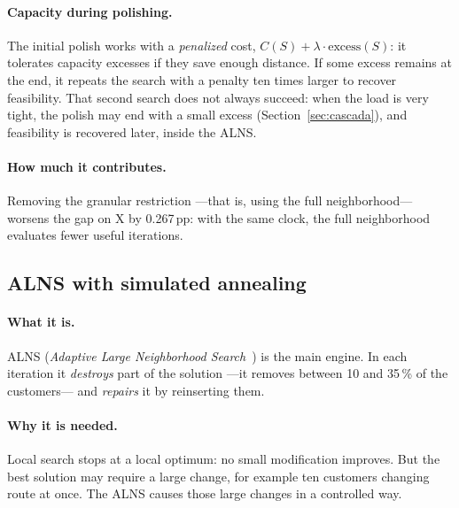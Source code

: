 \documentclass[11pt,a4paper]{article}
\newcommand{\pp}{\,pp}
\begin{document}
\paragraph{Capacity during polishing.} The initial polish works with a \emph{penalized} cost,
$C(S)+\lambda\cdot\text{excess}(S)$: it tolerates capacity excesses if they save enough distance. If
some excess remains at the end, it repeats the search with a penalty ten times larger to recover
feasibility. That second search does not always succeed: when the load is very tight, the polish may
end with a small excess (Section~\ref{sec:cascada}), and feasibility is recovered later, inside the
ALNS.

\paragraph{How much it contributes.} Removing the granular restriction ---that is, using the full
neighborhood--- worsens the gap on X by 0.267\pp{}: with the same clock, the full neighborhood
evaluates fewer useful iterations.

\subsection{ALNS with simulated annealing}
\label{sec:alns}

\paragraph{What it is.} ALNS (\emph{Adaptive Large Neighborhood Search}~\cite{shaw1998,ropke2006}) is
the main engine. In each iteration it \emph{destroys} part of the solution ---it removes between 10
and 35\,\% of the customers--- and \emph{repairs} it by reinserting them.

\paragraph{Why it is needed.} Local search stops at a local optimum: no small modification improves.
But the best solution may require a large change, for example ten customers changing route at once.
The ALNS causes those large changes in a controlled way.
\end{document}
